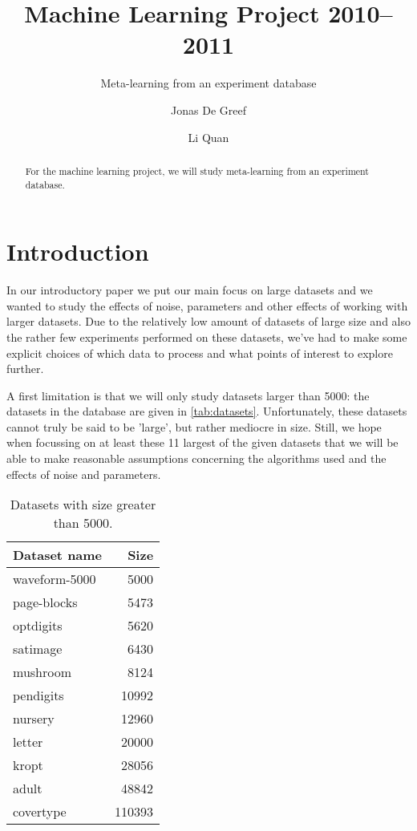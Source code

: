 \documentclass[a4paper,10pt,english]{scrartcl}
\title{Machine Learning Project 2010--2011}
\subtitle{Meta-learning from an experiment database}
\author{Jonas De Greef\and Li Quan}
\date{}
\begin{document}
\maketitle
\begin{abstract}
For the machine learning project, we will study meta-learning from an experiment database\cite{Blockeel06-KDID:proc,42686}.%
\end{abstract}


\section{Introduction}
In our introductory paper we put our main focus on large datasets and we wanted to study the effects of noise, parameters and other effects of working with larger datasets.
Due to the relatively low amount of datasets of large size and also the rather few experiments performed on these datasets, we've had to make some explicit choices of which data to process and what points of interest to explore further.

A first limitation is that we will only study datasets larger than 5000: the datasets in the database are given in \autoref{tab:datasets}. Unfortunately, these datasets cannot truly be said to be 'large', but rather mediocre in size. Still, we hope when focussing on at least these 11 largest of the given datasets that we will be able to make reasonable assumptions concerning the algorithms used and the effects of noise and parameters.

\begin{table}[hbpt]
\centering\footnotesize
\begin{tabular}{l r }
\toprule
Dataset name    & Size          \\\midrule
waveform-5000	& 5000            \\
page-blocks     & 5473          \\
optdigits	    & 5620            \\
satimage	    & 6430         \\
mushroom	    & 8124         \\
pendigits       & 10992         \\
nursery	        & 12960         \\
letter	        & 20000          \\
kropt	        & 28056        \\
adult	        & 48842           \\
covertype	    & 110393          \\

\bottomrule
\end{tabular}
\caption{Datasets with size greater than 5000.}
\label{tab:datasets}
\end{table}
\end{document}
